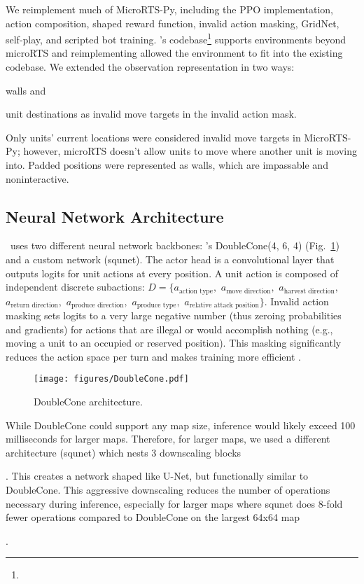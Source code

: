 \documentclass[conference]{IEEEtran}
\newif\ifsupplemental
\newcommand{\supptableref}[1]{%
  \ifsupplemental
    \ (Supplemental Table~\ref{#1})%
  \fi
}
\newcommand{\suppfigref}[1]{%
  \ifsupplemental
    \ (Supplemental Figure~\ref{#1})%
  \fi
}
\newcounter{supptable}
\begin{document}
We reimplement much of MicroRTS-Py, including the PPO implementation, action
composition, shaped reward function, invalid action masking, GridNet, self-play, and
scripted bot training. \agentName's codebase\footnote{\rlAlgoImplsGitHubUrl} supports 
environments beyond microRTS and reimplementing allowed the environment to fit into the 
existing codebase. We extended the observation representation in two ways:
\begin{inparaenum}[(1)]
    \item walls and
    \item unit destinations as invalid move targets in the invalid action mask.
\end{inparaenum}
Only units' current locations were considered invalid move targets in MicroRTS-Py;
however, microRTS doesn't allow units to move where another unit is moving into. Padded
positions were represented as walls, which are impassable and noninteractive.

\subsection{Neural Network Architecture}
\agentName\ uses two different neural network backbones:
\cite{Ferdinand2021doublecone}'s DoubleCone(4, 6, 4) (Fig.~\ref{fig:doublecone}) and a
custom network (squnet). The actor head is a convolutional layer that outputs logits for
unit actions at every position. A unit action is composed of independent discrete
subactions: $D = \{a_{\text{action type}},$ $a_{\text{move direction}},$
$a_{\text{harvest direction}},$ $a_{\text{return direction}},$ $a_{\text{produce
direction}},$ $a_{\text{produce type}},$ $a_{\text{relative attack position}}\}$.
Invalid action masking sets logits to a very large negative number (thus zeroing
probabilities and gradients) for actions that are illegal or would accomplish nothing
(e.g., moving a unit to an occupied or reserved position). This masking significantly
reduces the action space per turn and makes training more efficient
\cite{DBLP:journals/corr/abs-2006-14171}.

\begin{figure}[t]
    \centering
    \texttt{[image: figures/DoubleCone.pdf]}
    \caption{DoubleCone architecture.}
    \label{fig:doublecone}
\end{figure}

While DoubleCone could support any map size, inference would likely exceed 100
milliseconds for larger maps. Therefore, for larger maps, we used a different
architecture (squnet) which nests 3 downscaling blocks\suppfigref{fig:squnet}. This 
creates a network shaped like U-Net, but functionally similar to DoubleCone.
This aggressive downscaling reduces the number of operations necessary during inference,
especially for larger maps where squnet does 8-fold fewer operations compared to
DoubleCone on the largest 64x64 map\supptableref{table:architectureBreakdown}.
\end{document}
